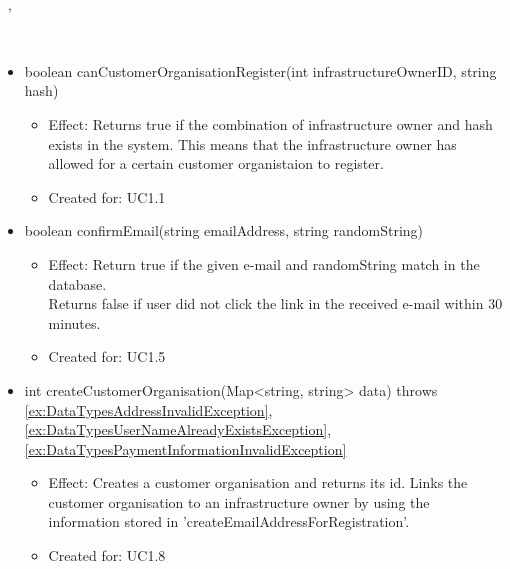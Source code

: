     \begin{description}
      \item[Provided by:] \iconcomponent{}~
      \item[Required by:] \iconcomponent{}~, \iconcomponent{}~
      \item[Operations:] ~
    \begin{itemize}[noitemsep,nolistsep,leftmargin=-.25cm]
      \item \textsf{boolean canCustomerOrganisationRegister(int infrastructureOwnerID, string hash)}
        \begin{itemize}[noitemsep,nolistsep]
           \item Effect: Returns true if the combination of infrastructure owner and hash exists in the system. This means that the infrastructure owner has allowed for a certain customer organistaion to register.
\item Created for: UC1.1
        \end{itemize}
      \item \textsf{boolean confirmEmail(string emailAddress, string randomString)}
        \begin{itemize}[noitemsep,nolistsep]
           \item Effect: Return true if the given e-mail and randomString match in the database. \\
Returns false if user did not click the link in the received e-mail within 30 minutes.
\item Created for: UC1.5
        \end{itemize}
      \item \textsf{int createCustomerOrganisation(Map\textless{}string, string\textgreater{} data) throws \ref{ex:DataTypesAddressInvalidException}, \ref{ex:DataTypesUserNameAlreadyExistsException}, \ref{ex:DataTypesPaymentInformationInvalidException}}
        \begin{itemize}[noitemsep,nolistsep]
           \item Effect: Creates a customer organisation and returns its id. Links the customer organisation to an infrastructure owner by using the information stored in 'createEmailAddressForRegistration'.
\item Created for: UC1.8
        \end{itemize}

\end{itemize}
\end{description}
